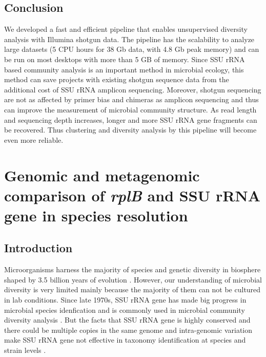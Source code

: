 \documentclass[]{msu-thesis}
\begin{document}
\section{Conclusion}

We developed a fast and efficient pipeline that enables unsupervised diversity analysis with Illumina shotgun data. The pipeline has the scalability to analyze large datasets (5 CPU hours for 38 Gb data, with 4.8 Gb peak memory) and can be run on most desktops with more than 5 GB of memory. Since SSU rRNA based community analysis is an important method in microbial ecology, this method can save projects with existing shotgun sequence data from the additional cost of SSU rRNA amplicon sequencing. Moreover, shotgun sequencing are not as affected by primer bias and chimeras as amplicon sequencing and thus can improve the measurement of microbial community structure. As read length and sequencing depth increases, longer and more SSU rRNA gene fragments can be recovered. Thus clustering and diversity analysis by this pipeline will become even more reliable.


\chapter{Genomic and metagenomic comparison of \textit{\texorpdfstring{\MakeLowercase{rpl}B}{rplB}} and SSU \texorpdfstring{\MakeLowercase{r}RNA}{rRNA} gene in species resolution}

\section{Introduction}

Microorganisms harness the majority of species and genetic diversity in biosphere shaped by 3.5 billion years of evolution \cite{locey_scaling_2016}. However, our understanding of microbial diversity is very limited mainly because the majority of them can not be cultured in lab conditions. Since late 1970s, SSU rRNA gene has made big progress in microbial species idenfication and is commonly used in microbial community diversity analysis \cite{woese_phylogenetic_1977,lane_rapid_1985,huse_exploring_2008,caporaso_ultra-high-throughput_2012}. But the facts that SSU rRNA gene is highly conserved and there could be multiple copies in the same genome and intra-genomic variation make SSU rRNA gene not effective in taxonomy identification at species and strain levels \cite{case_use_2007,roux_comparison_2011,wu_simple_2008}.
\end{document}

